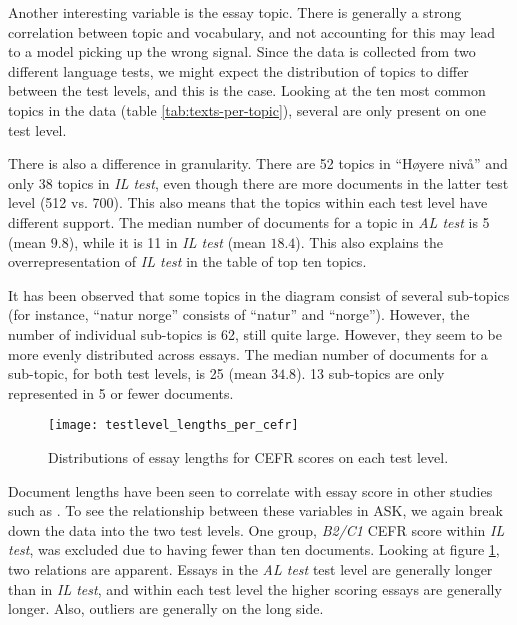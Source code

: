 Another interesting variable is the essay topic. There is generally a strong
correlation between topic and vocabulary, and not accounting for this may
lead to a model picking up the wrong signal. Since the data is collected from
two different language tests, we might expect the distribution of topics to
differ between the test levels, and this is the case. Looking at the ten most
common topics in the data (table \ref{tab:texts-per-topic}), several are only
present on one test level.

There is also a difference in granularity. There are 52 topics in ``Høyere
nivå'' and only 38 topics in \emph{IL test}, even though there are more
documents in the latter test level (512 vs. 700). This also means that the
topics within each test level have different support. The median number of
documents for a topic in \emph{AL test} is 5 (mean $9.8$), while it is 11 in
\emph{IL test} (mean $18.4$). This also explains the overrepresentation of
\emph{IL test} in the table of top ten topics.

It has been observed that some topics in the diagram consist of several
sub-topics (for instance, ``natur norge'' consists of ``natur'' and
``norge''). However, the number of individual sub-topics is 62, still quite
large. However, they seem to be more evenly distributed across essays. The
median number of documents for a sub-topic, for both test levels, is 25 (mean
$34.8$). 13 sub-topics are only represented in 5 or fewer documents.

\begin{figure}
  \centering
  \texttt{[image: testlevel\_lengths\_per\_cefr]}
  \caption[Document lengths on each CEFR level]{
    Distributions of essay lengths for CEFR scores on each test level.
  }
  \label{fig:testlevel-lengths-per-cefr}
\end{figure}

Document lengths have been seen to correlate with essay score in other
studies such as \textcite{vajjala17}. To see the relationship between these
variables in ASK, we again break down the data into the two test levels. One
group, \emph{B2/C1} CEFR score within \emph{IL test}, was excluded due to
having fewer than ten documents. Looking at figure
\ref{fig:testlevel-lengths-per-cefr}, two relations are apparent. Essays in
the \emph{AL test} test level are generally longer than in \emph{IL test},
and within each test level the higher scoring essays are generally longer.
Also, outliers are generally on the long side.

